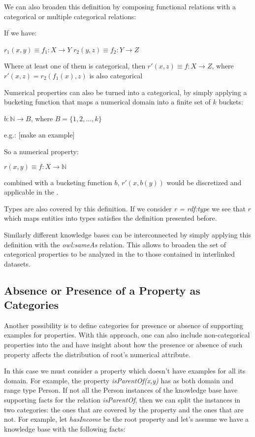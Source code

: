 We can also broaden this definition by composing functional relations with a categorical or multiple categorical
relations:

If we have:

$r_1(x,y) \equiv f_1 : X \rightarrow Y$ \newline
$r_2(y,z) \equiv f_2 : Y \rightarrow Z$ 

Where at least one of them is categorical, then $r'(x,z) \equiv f : X \rightarrow Z$, where $r'(x,z)=r_2(f_1(x),z)$ is also categorical


Numerical properties can also be turned into a categorical, by simply applying a bucketing function that maps a
numerical domain into a finite set of $k$ buckets:

$b: \mathbb{N} \rightarrow B$, where $B=\{1,2,\dots ,k \}$

e.g.: [make an example]

So a numerical property:

$r(x,y) \equiv f : X \rightarrow \mathbb{N}$ 

combined with a bucketing function $b$, $r'(x,b(y))$ would be discretized and applicable in the \graphname.

Types are also covered by this definition. If we consider \emph{r = rdf:type} we see that $r$ which maps entities into
types satisfies the definition presented before.

Similarly different knowledge bases can be interconnected by simply applying this definition with the \emph{owl:sameAs}
relation. This allows to broaden the set of categorical properties to be analyzed in the \graphname to those contained
in interlinked datasets.

\subsection{Absence or Presence of a Property as Categories}

Another possibility is to define categories for presence or absence of supporting examples for properties. With this
approach, one can also
include non-categorical properties into the \graphname and have insight about how the presence or absence of such
property affects the distribution of root's numerical attribute.

In this case we must consider a property which doesn't have examples for all its domain. For example, the property
\emph{isParentOf(x,y)} has as both domain and range type Person. If not all the Person instances of the knowledge base
have supporting facts for the relation \emph{isParentOf}, then we can
split the instances in two categories: the ones that are covered by the property and the ones that are not. For example,
let \emph{hasIncome} be the root property and let's assume we have a knowledge base with the following facts:

